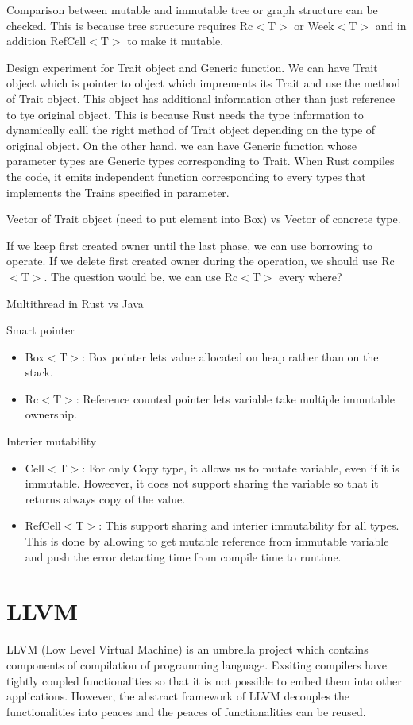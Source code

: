 Comparison between mutable and immutable tree or graph structure can be checked. 
This is because tree structure requires Rc$<$T$>$ or Week$<$T$>$ and in addition RefCell$<$T$>$ to make it mutable.

Design experiment for Trait object and Generic function. 
We can have Trait object which is pointer to object which imprements its Trait and use the method of Trait object.
This object has additional information other than just reference to tye original object. 
This is because Rust needs the type information to dynamically calll the right method of Trait object depending on the type of 
original object.
On the other hand, we can have Generic function whose parameter types are Generic types corresponding to Trait. 
When Rust compiles the code, it emits independent function corresponding to every types that implements the Trains specified in parameter.

Vector of Trait object (need to put element into Box) vs Vector of concrete type.


If we keep first created owner until the last phase, we can use borrowing to operate.
If we delete first created owner during the operation, we should use Rc$<$T$>$.
The question would be, we can use Rc$<$T$>$ every where?

Multithread in Rust vs Java

Smart pointer
\begin{itemize}
    \item Box$<$T$>$: Box pointer lets value allocated on heap rather than on the stack.
    \item Rc$<$T$>$: Reference counted pointer lets variable take multiple immutable ownership.
\end{itemize}

Interier mutability
\begin{itemize}
    \item Cell$<$T$>$: For only Copy type, it allows us to mutate variable, even if it is immutable. Howeever, it does not support sharing the variable so that it returns always copy of the value.
    \item RefCell$<$T$>$: This support sharing and interier immutability for all types. This is done by allowing to get mutable reference from immutable variable and push the error detacting time from compile time to runtime.
\end{itemize}    

\section{LLVM}
\label{sec:history}
LLVM (Low Level Virtual Machine) is an umbrella project which contains components of compilation of programming language.
Exsiting compilers have tightly coupled functionalities so that it is not possible to embed them into other applications.
However, the abstract framework of LLVM decouples the functionalities into peaces and the peaces of functionalities can be reused.

